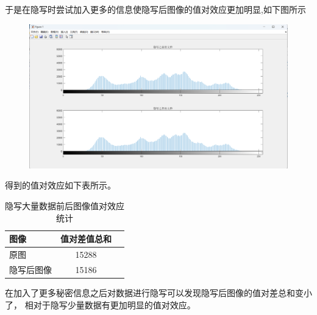 \documentclass[a4paper,11pt,UTF8]{ctexart}
\newcommand{\bottomcaption}{%
\setlength{\abovecaptionskip}{6pt}%
\setlength{\belowcaptionskip}{6pt}%
\caption}
\newcommand{\xiaowuhao}{\fontsize{9pt}{\baselineskip}\selectfont}   %
\begin{document}
\begin{itemize}
        于是在隐写时尝试加入更多的信息使隐写后图像的值对效应更加明显,如下图所示
        \begin{figure}[!htbp]
          \centering
          \includegraphics[width=\textwidth]{rehid.png}
          \bottomcaption{\xiaowuhao{重新隐写后图像的直方图}}
        \end{figure}
        得到的值对效应如下表所示。
        \begin{table}[!h!tbp]
          \caption{隐写大量数据前后图像值对效应统计}\label{tab2}
            \centering
          \begin{tabular*}{0.75\textwidth}{@{\extracolsep{\fill}}lcc}
              \toprule
              图像          &值对差值总和                \\
              \midrule
              原图              &15288         \\
              隐写后图像        &15186        \\
              \bottomrule
          \end{tabular*}
        \end{table}
        在加入了更多秘密信息之后对数据进行隐写可以发现隐写后图像的值对差总和变小了，
          相对于隐写少量数据有更加明显的值对效应。
    \end{itemize}
\end{document}
